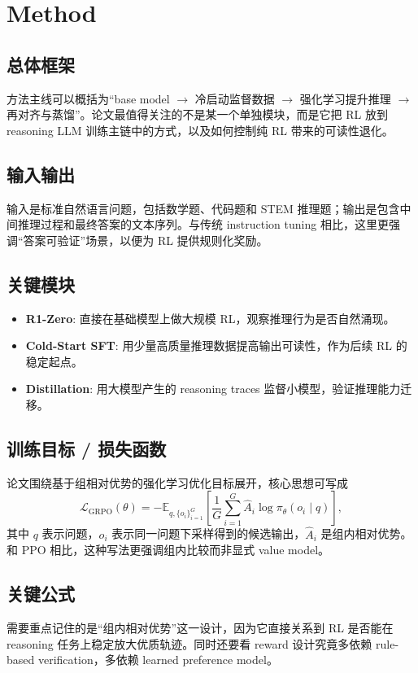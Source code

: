 \documentclass[UTF8,fontset=fandol,zihao=-4]{ctexart}
\begin{document}
\section{Method}

\subsection{总体框架}
方法主线可以概括为“base model $\rightarrow$ 冷启动监督数据 $\rightarrow$ 强化学习提升推理 $\rightarrow$ 再对齐与蒸馏”。论文最值得关注的不是某一个单独模块，而是它把 RL 放到 reasoning LLM 训练主链中的方式，以及如何控制纯 RL 带来的可读性退化。

\subsection{输入输出}
输入是标准自然语言问题，包括数学题、代码题和 STEM 推理题；输出是包含中间推理过程和最终答案的文本序列。与传统 instruction tuning 相比，这里更强调“答案可验证”场景，以便为 RL 提供规则化奖励。

\subsection{关键模块}
\begin{itemize}
  \item \textbf{R1-Zero}: 直接在基础模型上做大规模 RL，观察推理行为是否自然涌现。
  \item \textbf{Cold-Start SFT}: 用少量高质量推理数据提高输出可读性，作为后续 RL 的稳定起点。
  \item \textbf{Distillation}: 用大模型产生的 reasoning traces 监督小模型，验证推理能力迁移。
\end{itemize}

\subsection{训练目标 / 损失函数}
论文围绕基于组相对优势的强化学习优化目标展开，核心思想可写成
\begin{equation}
\mathcal{L}_{\mathrm{GRPO}}(\theta)
= - \mathbb{E}_{q, \{o_i\}_{i=1}^{G}}
\left[
\frac{1}{G}\sum_{i=1}^{G}
\hat{A}_i
\log \pi_{\theta}(o_i \mid q)
\right],
\end{equation}
其中 $q$ 表示问题，$o_i$ 表示同一问题下采样得到的候选输出，$\hat{A}_i$ 是组内相对优势。和 PPO 相比，这种写法更强调组内比较而非显式 value model。

\subsection{关键公式}
需要重点记住的是“组内相对优势”这一设计，因为它直接关系到 RL 是否能在 reasoning 任务上稳定放大优质轨迹。同时还要看 reward 设计究竟多依赖 rule-based verification，多依赖 learned preference model。
\end{document}

